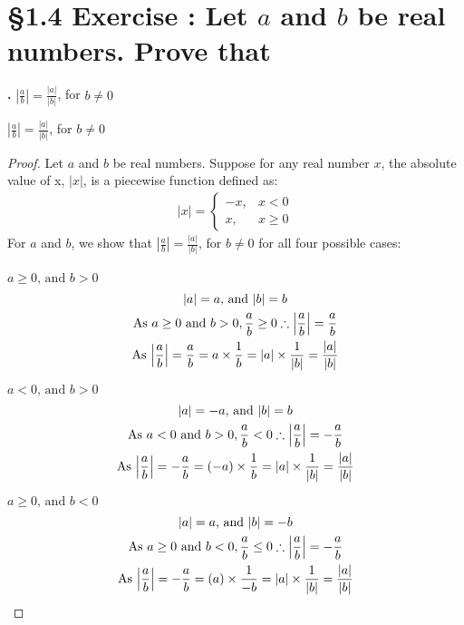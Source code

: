 \documentclass[a4paper,11pt]{article}
\DeclarePairedDelimiter\abs{\lvert}{\rvert}
\begin{document}
\addtocounter{SubsectionCounter}{2}
\section*{\S 1.4 Exercise : Let \( a\) and \( b \) be real numbers. Prove that}
\textbf{.}
\(|\frac{a}{b}| = \frac{|a|}{|b|}\), for \(b \neq 0\)

\begin{theorem2}
\(|\frac{a}{b}| = \frac{|a|}{|b|}\), for \(b \neq 0\)
\begin{proof}
Let \(a\) and \(b\) be real numbers. Suppose for any real number \(x\), the 
absolute value of x, \(|x|\), is a piecewise function defined as:
\begin{align}
  \label{quad}
     |x| = \left\{
     \begin{array}{lr}
       -x, & x < 0\\
        x, & x \geq 0
     \end{array}
   \right.
\end{align}
For \(a\) and \(b\), we show that \(|\frac{a}{b}| = \frac{|a|}{|b|}\), for \(b \neq 0\) for all four possible 
cases:\\ \\
\(a \geq 0 \text{, and } b > 0\)
\begin{gather*}
\label{case1}
|a| = a \text{, and } |b|=b\\
\text{As } a \geq 0 \text{ and } b > 0, \frac{a}{b} \geq 0 \therefore \abs*{\frac{a}{b}} = 
\frac{a}{b}\\
\text{As } \abs*{\frac{a}{b}} = \frac{a}{b} = a \times \frac{1}{b} = \abs*{a}\times\frac{1}{\abs{b}} = \frac{\abs{a}}{\abs{b}}
\end{gather*}

\noindent {}\(a < 0 \text{, and } b > 0\)
\begin{gather*}
\label{case2}
|a| = -a \text{, and } |b|=b\\
\text{As } a < 0 \text{ and } b > 0, \frac{a}{b} < 0 \therefore \abs*{\frac{a}{b}} = -\frac{a}{b}\\
\text{As } \abs*{\frac{a}{b}} = -\frac{a}{b} = (-a) \times \frac{1}{b} = \abs*{a}\times\frac{1}{\abs{b}} = \frac{\abs{a}}{\abs{b}}
\end{gather*}

\noindent{}\(a \geq 0 \text{, and } b < 0\)
\begin{gather*}
\label{case3}
|a| = a \text{, and } |b|=-b\\
\text{As } a \geq 0 \text{ and } b < 0, \frac{a}{b} \leq 0 \therefore \abs*{\frac{a}{b}} = -\frac{a}{b}\\
\text{As } \abs*{\frac{a}{b}} = -\frac{a}{b} = (a) \times \frac{1}{-b} = \abs*{a}\times\frac{1}{\abs{b}} = \frac{\abs{a}}{\abs{b}}
\end{gather*}


\end{proof}
\end{theorem2}
\end{document}
